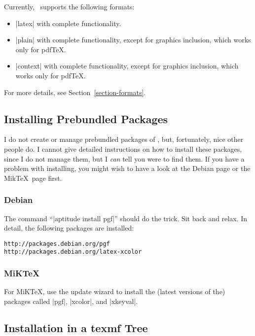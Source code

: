 Currently, \pgfname\ supports the following formats:
\begin{itemize}
\item
  |latex| with complete functionality.
\item
  |plain| with complete functionality, except for graphics inclusion,
  which works only for pdf\TeX.
\item
  |context| with complete functionality, except for graphics inclusion,
  which works only for pdf\TeX.
\end{itemize}

For more details, see Section~\ref{section-formats}.



\subsection{Installing Prebundled Packages}

I do not create or manage prebundled packages of \pgfname, but,
fortunately, nice other people do. I cannot give detailed instructions
on how to install these packages, since I do not manage them, but I
\emph{can} tell you were to find them. If you have a problem with
installing, you might wish to have a look at the Debian page or the
Mik\TeX\ page first.


\subsubsection{Debian}

The command ``|aptitude install pgf|'' should do the trick. Sit back
and relax. In detail, the following packages are installed:  
\begin{verbatim}
http://packages.debian.org/pgf
http://packages.debian.org/latex-xcolor
\end{verbatim}


\subsubsection{MiKTeX}

For MiK\TeX, use the update wizard to install the (latest versions of
the) packages called |pgf|, |xcolor|, and |xkeyval|. 




\subsection{Installation in a texmf Tree}

